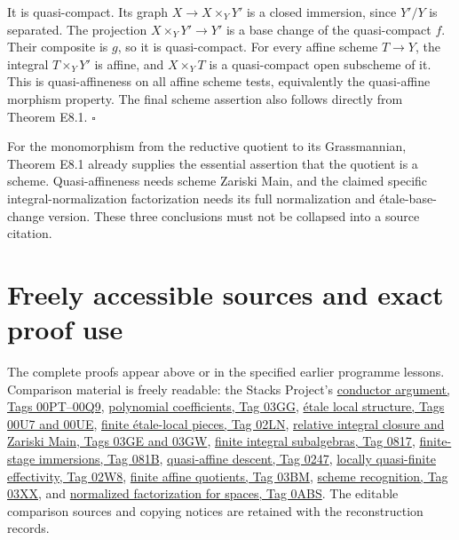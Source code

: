 \documentclass[11pt,a4paper,openany]{report}
\begin{document}
\begingroup{}
It is quasi-compact. Its graph \(X\to X\times_Y Y'\) is a closed immersion, since \(Y'/Y\) is separated. The projection \(X\times_Y Y'\to Y'\) is a base change of the quasi-compact \(f\). Their composite is \(g\), so it is quasi-compact. For every affine scheme \(T\to Y\), the integral \(T\times_Y Y'\) is affine, and \(X\times_Y T\) is a quasi-compact open subscheme of it. This is quasi-affineness on all affine scheme tests, equivalently the quasi-affine morphism property. The final scheme assertion also follows directly from Theorem E8.1. \(\square\)
\par\endgroup

For the monomorphism from the reductive quotient to its Grassmannian, Theorem E8.1 already supplies the essential assertion that the quotient is a scheme. Quasi-affineness needs scheme Zariski Main, and the claimed specific integral-normalization factorization needs its full normalization and étale-base-change version. These three conclusions must not be collapsed into a source citation.

\section{Freely accessible sources and exact proof use}\label{AG-RG-S04-freely-accessible-sources-and-exact-proof-use}

The complete proofs appear above or in the specified earlier programme lessons. Comparison material is freely readable: the Stacks Project's \href{https://stacks.math.columbia.edu/tag/00Q9}{conductor argument, Tags 00PT--00Q9}, \href{https://stacks.math.columbia.edu/tag/03GG}{polynomial coefficients, Tag 03GG}, \href{https://stacks.math.columbia.edu/tag/00UE}{étale local structure, Tags 00U7 and 00UE}, \href{https://stacks.math.columbia.edu/tag/02LN}{finite étale-local pieces, Tag 02LN}, \href{https://stacks.math.columbia.edu/tag/03GW}{relative integral closure and Zariski Main, Tags 03GE and 03GW}, \href{https://stacks.math.columbia.edu/tag/0817}{finite integral subalgebras, Tag 0817}, \href{https://stacks.math.columbia.edu/tag/081B}{finite-stage immersions, Tag 081B}, \href{https://stacks.math.columbia.edu/tag/0247}{quasi-affine descent, Tag 0247}, \href{https://stacks.math.columbia.edu/tag/02W8}{locally quasi-finite effectivity, Tag 02W8}, \href{https://stacks.math.columbia.edu/tag/03BM}{finite affine quotients, Tag 03BM}, \href{https://stacks.math.columbia.edu/tag/03XX}{scheme recognition, Tag 03XX}, and \href{https://stacks.math.columbia.edu/tag/0ABS}{normalized factorization for spaces, Tag 0ABS}. The editable comparison sources and copying notices are retained with the reconstruction records.
\end{document}
